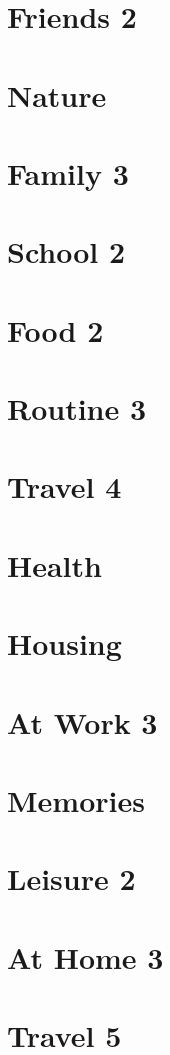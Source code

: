 \documentclass[a4paper,11pt,oneside]{book}
\begin{document}
\section{Friends 2}
\section{Nature}
\section{Family 3}
\section{School 2}
\section{Food 2}
\section{Routine 3}
\section{Travel 4}
\section{Health}
\section{Housing}
\section{At Work 3}
\section{Memories}
\section{Leisure 2}
\section{At Home 3}
\section{Travel 5}
\end{document}
